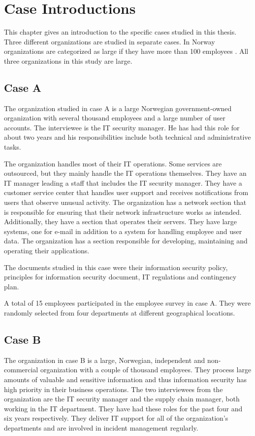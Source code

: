 \chapter{Case Introductions}
\label{chp:CaseIntroductions}
This chapter gives an introduction to the specific cases studied in this thesis. Three  different organizations are studied in separate cases. In Norway organizations are categorized as large if they have more than 100 employees \cite{SMB}. All three organizations in this study are large.

\section{Case A}
The organization studied in case A is a large Norwegian government-owned organization with several thousand employees and a large number of user accounts. The interviewee is the IT security manager. He has had this role for about two years and his responsibilities include both technical and administrative tasks. 

The organization handles most of their IT operations. Some services are outsourced, but they mainly handle the IT operations themselves. They have an IT manager leading a staff that includes the IT security manager. They have a customer service center that handles user support and receives notifications from users that observe unusual activity. The organization has a network section that is responsible for ensuring that their network infrastructure works as intended. Additionally, they have a section that operates their servers. They have large systems, one for e-mail in addition to a system for handling employee and user data. The organization has a section responsible for developing, maintaining and operating their applications.

The documents studied in this case were their information security policy, principles for information security document, IT regulations and contingency plan.

A total of 15 employees participated in the employee survey in case A. They were randomly selected from four departments at different geographical locations. 

\section{Case B}
The organization in case B is a large, Norwegian, independent and non-commercial organization with a couple of thousand employees. They process large amounts of valuable and sensitive information and thus information security has high priority in their business operations. The two interviewees from the organization are the IT security manager and the supply chain manager, both working in the IT department. They have had these roles for the past four and six years respectively. They deliver IT support for all of the organization's departments and are involved in incident management regularly.   

